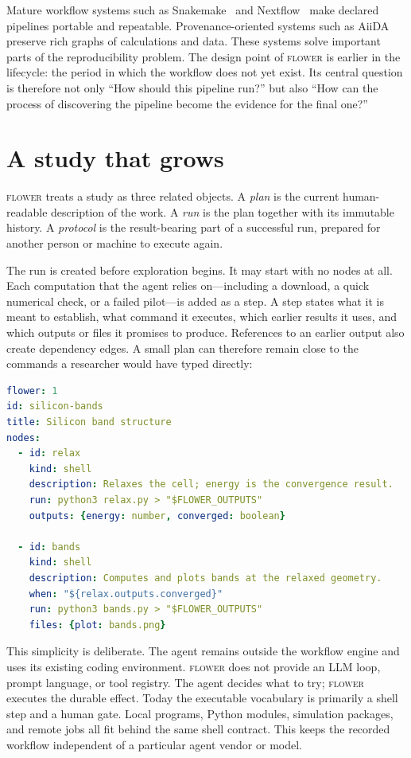 \documentclass[10pt]{article}
\newcommand{\flower}{\textsc{flower}}
\begin{document}
Mature workflow systems such as Snakemake~\cite{koster2012snakemake} and
Nextflow~\cite{ditommaso2017nextflow} make declared pipelines portable and repeatable. Provenance-oriented
systems such as AiiDA~\cite{huber2020aiida} preserve rich graphs of calculations and data. These systems solve
important parts of the reproducibility problem. The design point of \flower{} is earlier in the lifecycle: the
period in which the workflow does not yet exist. Its central question is therefore not only ``How should this
pipeline run?'' but also ``How can the process of discovering the pipeline become the evidence for the final
one?''

\section{A study that grows}

\flower{} treats a study as three related objects. A \emph{plan} is the current human-readable description of
the work. A \emph{run} is the plan together with its immutable history. A \emph{protocol} is the result-bearing
part of a successful run, prepared for another person or machine to execute again.

The run is created before exploration begins. It may start with no nodes at all. Each computation that the
agent relies on---including a download, a quick numerical check, or a failed pilot---is added as a step. A
step states what it is meant to establish, what command it executes, which earlier results it uses, and which
outputs or files it promises to produce. References to an earlier output also create dependency edges. A
small plan can therefore remain close to the commands a researcher would have typed directly:

\begin{lstlisting}[language=yaml,caption={A minimal \flower{} plan.}]
flower: 1
id: silicon-bands
title: Silicon band structure
nodes:
  - id: relax
    kind: shell
    description: Relaxes the cell; energy is the convergence result.
    run: python3 relax.py > "$FLOWER_OUTPUTS"
    outputs: {energy: number, converged: boolean}

  - id: bands
    kind: shell
    description: Computes and plots bands at the relaxed geometry.
    when: "${relax.outputs.converged}"
    run: python3 bands.py > "$FLOWER_OUTPUTS"
    files: {plot: bands.png}
\end{lstlisting}

This simplicity is deliberate. The agent remains outside the workflow engine and uses its existing coding
environment. \flower{} does not provide an LLM loop, prompt language, or tool registry. The agent decides what
to try; \flower{} executes the durable effect. Today the executable vocabulary is primarily a shell step and a
human gate. Local programs, Python modules, simulation packages, and remote jobs all fit behind the same shell
contract. This keeps the recorded workflow independent of a particular agent vendor or model.
\end{document}
